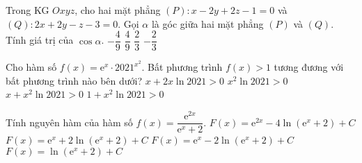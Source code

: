 \begin{ex}%
	Trong KG $Oxyz$, cho hai mặt phẳng $(P)\colon x-2y+2z-1=0$ và $(Q)\colon2x+2y-z-3=0$. Gọi $\alpha$ là góc giữa hai mặt phẳng $(P)$ và $(Q)$. Tính giá trị của $\cos\alpha$.
	\choice
	{$-\dfrac{4}{9}$}
	{\True $\dfrac{4}{9}$}
	{$\dfrac{2}{3}$}
	{$-\dfrac{2}{3}$}
\end{ex}
\begin{ex}%
	Cho hàm số $f(x)=\mathrm{e}^x\cdot2021^{x^2}$. Bất phương trình $f(x)>1$ tương đương với bất phương trình nào bên dưới?
	\choice
	{$x+2x\ln2021>0$}
	{$x^2\ln2021>0$}
	{\True $x+x^2\ln2021>0$}
	{$1+x^2\ln2021>0$}
\end{ex}
\begin{ex}%
	Tính nguyên hàm của hàm số $f(x)=\dfrac{\mathrm{e}^{2x}}{\mathrm{e}^x+2}$.
	\choice
	{$F(x)=\mathrm{e}^{2x}-4\ln\left(\mathrm{e}^x+2\right)+C$}
	{$F(x)=\mathrm{e}^x+2\ln\left(\mathrm{e}^x+2\right)+C$}
	{\True $F(x)=\mathrm{e}^x-2\ln\left(\mathrm{e}^x+2\right)+C$}
	{$F(x)=\ln\left(\mathrm{e}^x+2\right)+C$}
\end{ex}
